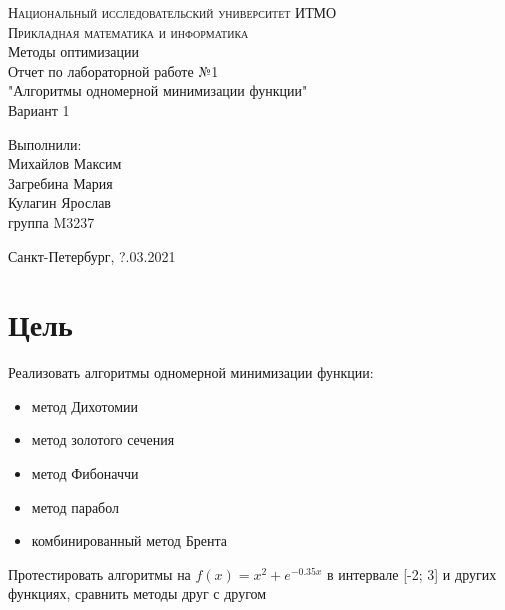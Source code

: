 





\begin{titlepage}
\begin{center}
\textsc{Национальный исследовательский университет ИТМО\\
Прикладная математика и информатика}\\[5cm]

\huge{Методы оптимизации\\[6mm]
\large Отчет по лабораторной работе №1\\
"Алгоритмы одномерной минимизации функции"\\[6mm]
Вариант 1
\\[3cm]
}
\end{center}

\begin{flushright} 
\begin{minipage}{0.25\textwidth} 
    Выполнили:\\[2mm] 
        Михайлов Максим\\
        Загребина Мария\\
        Кулагин Ярослав\\[2mm]
    группа M3237
\end{minipage}
\end{flushright}

\vfill
\begin{center}
 Санкт-Петербург, ?.03.2021
\end{center}
\end{titlepage}





\section{Цель}
Реализовать алгоритмы одномерной минимизации функции:
\begin{itemize}
    \item метод Дихотомии
    \item метод золотого сечения
    \item метод Фибоначчи
    \item метод парабол
    \item комбинированный метод Брента
\end{itemize}
Протестировать алгоритмы на \(f(x) = x^2 + e^{-0.35x}\) в интервале [-2; 3] и других функциях, сравнить методы друг с другом




